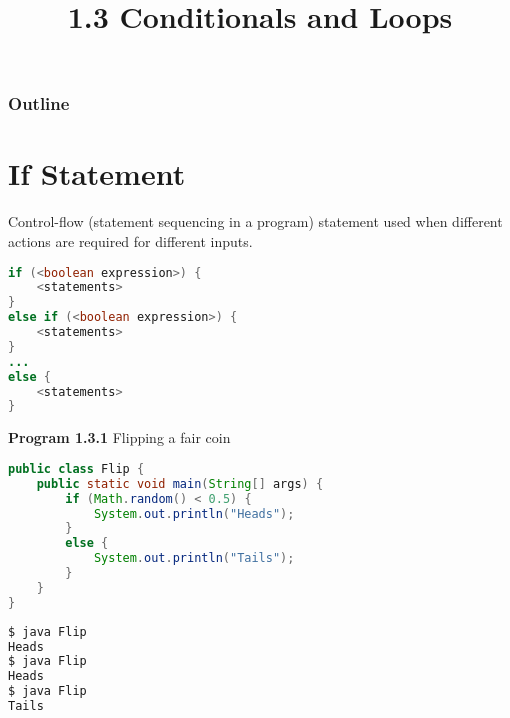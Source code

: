 \documentclass[8pt,a4paper,compress]{beamer}
\title{1.3 Conditionals and Loops}
\date{}
\begin{document}
\begin{frame}
\vfill
\titlepage
\end{frame}

\begin{frame}
\frametitle{Outline}
\tableofcontents
\end{frame}

\section{If Statement}
\begin{frame}[fragile]
\pause

Control-flow (statement sequencing in a program) statement used when different actions are required for different inputs.

\begin{lstlisting}[language=Java]
if (<boolean expression>) {
    <statements>
}
else if (<boolean expression>) {
    <statements>
}
...
else {
    <statements>
}
\end{lstlisting}

\pause
\smallskip

\textbf{Program 1.3.1} Flipping a fair coin

\begin{lstlisting}[language=Java]
public class Flip {
    public static void main(String[] args) { 
        if (Math.random() < 0.5) { 
            System.out.println("Heads");
        }
        else {                     
            System.out.println("Tails");
        }
    }
}
\end{lstlisting}

\pause

\begin{lstlisting}[language=bash]
$ java Flip 
Heads
$ java Flip 
Heads
$ java Flip 
Tails
\end{lstlisting}
\end{frame}
\end{document}
